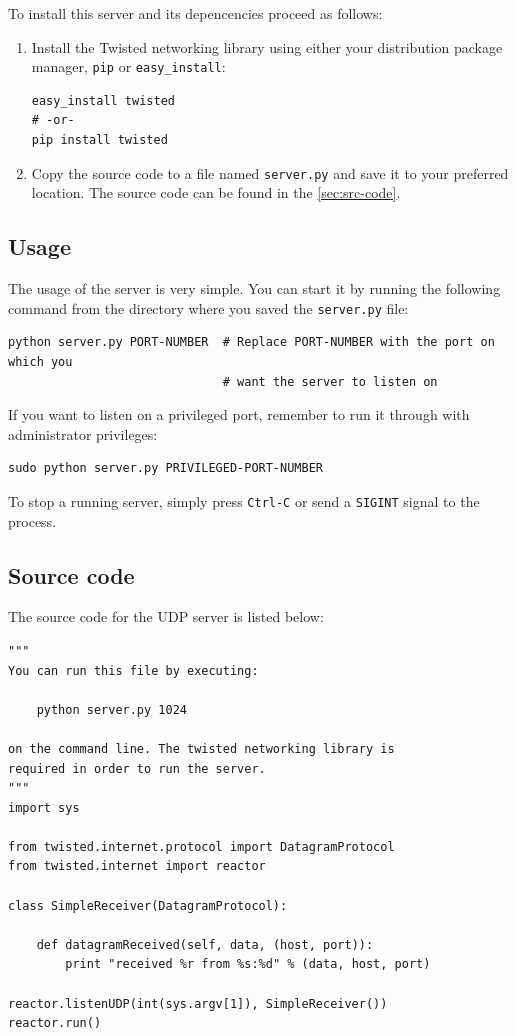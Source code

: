 \documentclass[10pt,a4paper,twoside,onecolumn]{article}
\begin{document}
To install this server and its depencencies proceed as follows:

\begin{enumerate}
	\item Install the Twisted networking library using either your distribution package manager, \texttt{pip} or \texttt{easy\_install}:
	\lstset{caption=,label=,language=bash}
\begin{lstlisting}
easy_install twisted
# -or-
pip install twisted
\end{lstlisting}
	\item Copy the source code to a file named \texttt{server.py} and save it to your preferred location. The source code can be found in the \autoref{sec:src-code}.

\end{enumerate}

\subsection{Usage}

The usage of the server is very simple. You can start it by running the following command from the directory where you saved the \texttt{server.py} file:
\lstset{caption=,label=,language=bash}
\begin{lstlisting}
python server.py PORT-NUMBER  # Replace PORT-NUMBER with the port on which you
                              # want the server to listen on
\end{lstlisting}

If you want to listen on a privileged port, remember to run it through with administrator privileges:

\begin{lstlisting}
sudo python server.py PRIVILEGED-PORT-NUMBER
\end{lstlisting}

To stop a running server, simply press \texttt{Ctrl-C} or send a \texttt{SIGINT} signal to the process.



\subsection{Source code}
\label{sec:src-code}

The source code for the UDP server is listed below:

\lstset{caption=,label=lst:udp-server,language=python,numbers=left}
\begin{lstlisting}
"""
You can run this file by executing:

    python server.py 1024

on the command line. The twisted networking library is
required in order to run the server.
"""
import sys

from twisted.internet.protocol import DatagramProtocol
from twisted.internet import reactor

class SimpleReceiver(DatagramProtocol):

    def datagramReceived(self, data, (host, port)):
        print "received %r from %s:%d" % (data, host, port)

reactor.listenUDP(int(sys.argv[1]), SimpleReceiver())
reactor.run()
\end{lstlisting}
\end{document}

